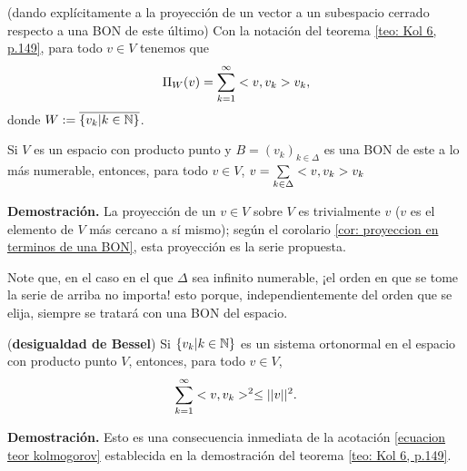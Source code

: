 \QEDB
\vspace{0.2cm}


\begin{cor} \label{cor: proyeccion en terminos de una BON}
(dando explícitamente a la proyección de un vector
a un subespacio cerrado respecto a una BON de este último)
Con la notación del teorema \ref{teo: Kol 6, p.149},
para todo $v \in V$
tenemos que
\[
\Pi_{W}(v) = \sum\limits_{k=1}^{\infty}<v, v_{k}>v_{k},
\]
donde $W := \overline{\{v_{k}| k \in \mathbb{N} \}}$. 
\end{cor}


\begin{cor} \label{cor: representacion de un vector respecto a una BON}
Si $V$ es un espacio con producto punto 
y $B=(v_{k})_{k \in \Delta}$ es una BON de este
a lo más numerable, entonces, para todo
$v \in V$, $v = \sum\limits_{k \in \Delta}^{}<v, v_{k}>v_{k}$
\end{cor}
\noindent
\textbf{Demostración.}
La proyección de un $v \in V$ sobre $V$ es trivialmente $v$
($v$ es el elemento de $V$ más cercano a sí mismo); según el corolario
\ref{cor: proyeccion en terminos de una BON}, esta
proyección es la serie propuesta. \QEDB
\vspace{0.2cm}

Note que, en el caso en el que $\Delta$ sea infinito numerable,
¡el orden en que se tome la serie de arriba no importa! esto porque,
independientemente del orden que se elija, siempre se tratará con
una BON del espacio. \\

\begin{cor}(\textbf{desigualdad de Bessel})
Si $\{ v_{k} | k \in \mathbb{N} \}$ es un sistema ortonormal en 
el espacio con producto punto $V$, entonces, para todo $v\in V$,
\[
\sum\limits_{k=1}^{\infty}<v , v_{k} >^{2} \leq ||v||^{2}.
\]
\end{cor}
\noindent
\textbf{Demostración.}
Esto es una consecuencia inmediata de la acotación
\eqref{ecuacion teor kolmogorov} establecida en la demostración
del teorema \ref{teo: Kol 6, p.149}.
\QEDB
\vspace{0.2cm}